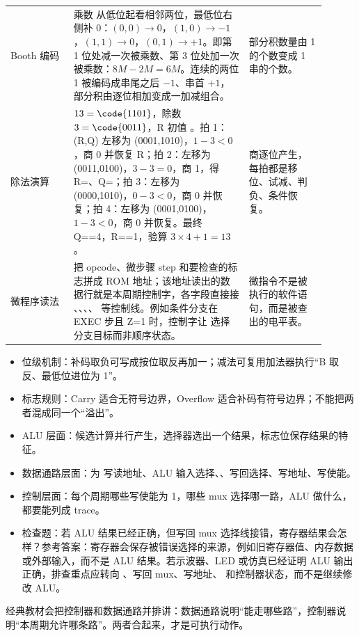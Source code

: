 \begin{longtable}{L{0.18\linewidth}L{0.5\linewidth}L{0.22\linewidth}}
Booth 编码 & 乘数  从低位起看相邻两位，最低位右侧补 0：$(0,0)\to0$，$(1,0)\to-1$，$(1,1)\to0$，$(0,1)\to+1$。即第 1 位处减一次被乘数、第 3 位处加一次被乘数：$8M-2M=6M$。连续的两位 1 被编码成串尾之后 $-1$、串首 $+1$，部分积由逐位相加变成一加减组合。 & 部分积数量由 1 的个数变成 1 串的个数。 \\
除法演算 & $13=\code{1101}$，除数 $3=\code{0011}$，R 初值 。拍 1：(R,Q) 左移为 (0001,1010)，$1-3<0$，商 0 并恢复 R；拍 2：左移为 (0011,0100)，$3-3=0$，商 1，得 R=、Q=；拍 3：左移为 (0000,1010)，$0-3<0$，商 0 并恢复；拍 4：左移为 (0001,0100)，$1-3<0$，商 0 并恢复。最终 Q==4，R==1，验算 $3\times4+1=13$。 & 商逐位产生，每拍都是移位、试减、判负、条件恢复。 \\
微程序读法 & 把 opcode、微步骤 step 和要检查的标志拼成 ROM 地址；该地址读出的数据行就是本周期控制字，各字段直接接 、、、、 等控制线。例如条件分支在 EXEC 步且 Z=1 时，控制字让  选择分支目标而非顺序状态。 & 微指令不是被执行的软件语句，而是被查出的电平表。 \\
\bottomrule
\end{longtable}

\begin{itemize}
\item 位级机制：补码取负可写成按位取反再加一；减法可复用加法器执行“B 取反、最低位进位为 1”。
\item 标志规则：Carry 适合无符号边界，Overflow 适合补码有符号边界；不能把两者混成同一个“溢出”。
\item ALU 层面：候选计算并行产生，选择器选出一个结果，标志位保存结果的特征。
\item 数据通路层面：为  写读地址、ALU 输入选择、、写回选择、写地址、写使能。
\item 控制层面：每个周期哪些写使能为 1，哪些 mux 选择哪一路，ALU 做什么，都要能列成 trace。
\item 检查题：若 ALU 结果已经正确，但写回 mux 选择线接错，寄存器结果会怎样？参考答案：寄存器会保存被错误选择的来源，例如旧寄存器值、内存数据或外部输入，而不是 ALU 结果。若示波器、LED 或仿真已经证明 ALU 输出正确，排查重点应转向 、写回 mux、写地址、 和控制器状态，而不是继续修改 ALU。
\end{itemize}

经典教材会把控制器和数据通路并排讲：数据通路说明“能走哪些路”，控制器说明“本周期允许哪条路”。两者合起来，才是可执行动作。
